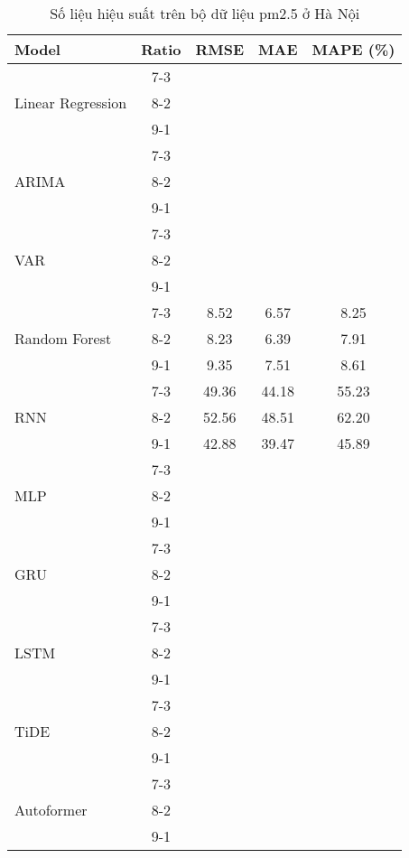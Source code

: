 \begin{table}[h!]
    \centering
    \caption{Số liệu hiệu suất trên bộ dữ liệu pm2.5 ở Hà Nội}
    \begin{tabular}{|l|c|c|c|c|}
    \hline
    \rowcolor{orange!30} \textbf{Model} & \textbf{Ratio} & \textbf{RMSE} & \textbf{MAE} & \textbf{MAPE (\%)} \\ \hline
    \rowcolor{white} & 7-3 &  &  &  \\ 
    \rowcolor{white} Linear Regression & 8-2 &  &  &  \\ 
    \rowcolor{white} & 9-1 &  &  &  \\ \hline
    \rowcolor{white} & 7-3 &  &  &  \\ 
    \rowcolor{white} ARIMA & 8-2 &  &  &  \\ 
    \rowcolor{white} & 9-1 &  &  &  \\ \hline
    \rowcolor{white} & 7-3 &  &  &  \\ 
    \rowcolor{white} VAR & 8-2 &  &  &  \\ 
    \rowcolor{white} & 9-1 &  &  & \\ \hline
    \rowcolor{white} & 7-3 & 8.52 & 6.57 & 8.25 \\ 
    \rowcolor{white} Random Forest & 8-2 & 8.23 & 6.39 & 7.91 \\ 
    \rowcolor{white} & 9-1 & 9.35 & 7.51 & 8.61 \\ \hline
    \rowcolor{white}  & 7-3 & 49.36 & 44.18 & 55.23 \\ 
    \rowcolor{white} RNN & 8-2 & 52.56 & 48.51 & 62.20 \\
    \rowcolor{white}  & 9-1 & 42.88 & 39.47 & 45.89 \\ \hline
    \rowcolor{white} & 7-3 &  &  &  \\ 
    \rowcolor{white} MLP & 8-2 &  &  &  \\ 
    \rowcolor{white} & 9-1 &  &  &  \\ \hline
    \rowcolor{white} & 7-3 &  &  &  \\ 
    \rowcolor{white} GRU & 8-2 &  &  &  \\ 
    \rowcolor{white} & 9-1 &  &  &  \\ \hline
    \rowcolor{white} & 7-3 &  &  &  \\ 
    \rowcolor{white} LSTM & 8-2 &  &  &  \\ 
    \rowcolor{white} & 9-1 &  &  &  \\ \hline
    \rowcolor{white!30} & 7-3 &  &  &  \\ 
    \rowcolor{white!30} TiDE & 8-2 &  &  &  \\ 
    \rowcolor{white!30} & 9-1 &  &  &  \\ \hline
    \rowcolor{white} & 7-3 &  &  &  \\ 
    \rowcolor{white} Autoformer & 8-2 &  &  &  \\ 
    \rowcolor{white} & 9-1 &  &  &  \\ \hline

    \end{tabular}
\end{table}